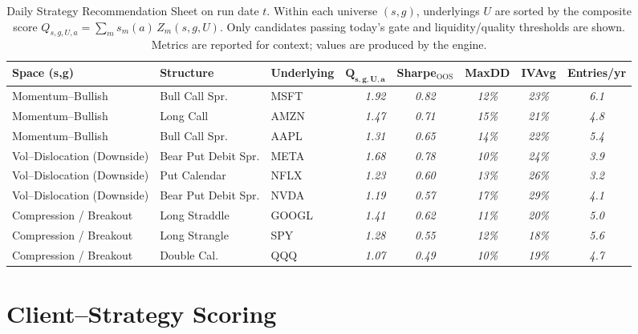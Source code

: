 \documentclass[12pt,a4paper]{report}
\begin{document}
\begin{table}[h]
\centering
\begin{tabular}{lllrcccc}
\toprule
\textbf{Space (s,g)} & \textbf{Structure} & \textbf{Underlying} & \(\mathbf{Q_{s,g,U,a}}\) & Sharpe$_{\text{OOS}}$ & MaxDD & IVAvg & Entries/yr \\
\midrule
Momentum–Bullish & Bull Call Spr. & MSFT & \emph{1.92} & \emph{0.82} & \emph{12\%} & \emph{23\%} & \emph{6.1} \\
Momentum–Bullish & Long Call      & AMZN & \emph{1.47} & \emph{0.71} & \emph{15\%} & \emph{21\%} & \emph{4.8} \\
Momentum–Bullish & Bull Call Spr. & AAPL & \emph{1.31} & \emph{0.65} & \emph{14\%} & \emph{22\%} & \emph{5.4} \\
\midrule
Vol–Dislocation (Downside) & Bear Put Debit Spr. & META & \emph{1.68} & \emph{0.78} & \emph{10\%} & \emph{24\%} & \emph{3.9} \\
Vol–Dislocation (Downside) & Put Calendar        & NFLX & \emph{1.23} & \emph{0.60} & \emph{13\%} & \emph{26\%} & \emph{3.2} \\
Vol–Dislocation (Downside) & Bear Put Debit Spr. & NVDA & \emph{1.19} & \emph{0.57} & \emph{17\%} & \emph{29\%} & \emph{4.1} \\
\midrule
Compression / Breakout & Long Straddle  & GOOGL & \emph{1.41} & \emph{0.62} & \emph{11\%} & \emph{20\%} & \emph{5.0} \\
Compression / Breakout & Long Strangle  & SPY   & \emph{1.28} & \emph{0.55} & \emph{12\%} & \emph{18\%} & \emph{5.6} \\
Compression / Breakout & Double Cal.    & QQQ   & \emph{1.07} & \emph{0.49} & \emph{10\%} & \emph{19\%} & \emph{4.7} \\
\bottomrule
\end{tabular}
\caption{Daily Strategy Recommendation Sheet on run date \(t\).
Within each universe \((s,g)\), underlyings \(U\) are sorted by the composite score \(Q_{s,g,U,a}=\sum_{m} s_m(a)\,Z_m(s,g,U)\).
Only candidates passing today’s gate and liquidity/quality thresholds are shown. Metrics are reported for context; values are produced by the engine.}
\label{tab:daily_reco_sheet}
\end{table}

\section{Client–Strategy Scoring }
\label{sec:client_scoring_simple}
\end{document}
